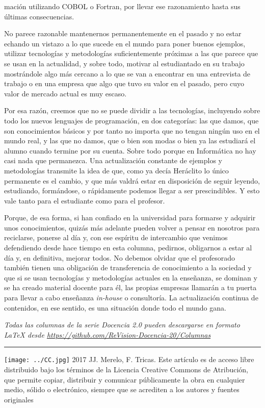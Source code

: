 \documentclass[twoside,10pt]{article}
\newcommand{\surl}[1]{{\small\url{#1}}}
\newcounter{vol}
\begin{document}
\begin{multicols}{2}
\noindent 
mación utilizando COBOL o Fortran, por llevar
ese razonamiento hasta sus últimas consecuencias. 


No parece razonable mantenernos permanentemente en el pasado y no
estar
echando un vistazo a lo que sucede en el mundo para poner
buenos ejemplos, utilizar tecnologías y metodologías suficientemente
próximas
a las que parece que se usan en la actualidad, y sobre todo,
motivar al estudiantado en su trabajo mostrándole algo más cercano a
lo que se van a encontrar en una entrevista de trabajo o en una
empresa que algo que tuvo su valor en el pasado, pero cuyo valor de
mercado actual es muy escaso. 

Por esa razón, creemos que no se puede dividir a
las tecnologías, incluyendo sobre todo los nuevos lenguajes de
programación, en dos categorías: las que damos, que son
conocimientos básicos y por tanto no importa que no tengan
ningún uso en el mundo real, y las que no damos, que o bien
son modas o bien ya las estudiará el alumno cuando termine por
su cuenta. Sobre todo porque en Informática no hay casi nada que
permanezca. Una
actualización constante de ejemplos y metodologías transmite la idea
de que, como ya decía Heráclito lo único permanente es el cambio, y
que más valdrá estar en disposición de seguir leyendo, estudiando,
formándose, o rápidamente podemos llegar a ser prescindibles.  Y esto
vale tanto para el estudiante como para el profesor. 

Porque, de esa forma, si han confiado en la universidad para formarse
y adquirir unos conocimientos, quizás más adelante pueden volver a
pensar en nosotros para reciclarse, ponerse al día y, con ese espíritu
de intercambio que venimos defendiendo desde hace tiempo en esta
columna, pedirnos, obligarnos a estar al día y, en definitiva, mejorar
todos. No debemos olvidar que el profesorado también tienen una
obligación de transferencia de conocimiento a la sociedad y que si se
usan tecnologías y metodologías actuales en la enseñanza, se dominan y
se ha creado material docente para él, las propias empresas llamarán a
tu puerta para llevar a cabo enseñanza {\em in-house} o
consultoría. La actualización continua de contenidos, en ese sentido,
es una situación donde todo el mundo gana. 

\medskip

\noindent\emph{Todas las columnas de la serie Docencia 2.0
pueden descargarse en formato LaTeX desde
\surl{https://github.com/ReVision-Docencia-20/Columnas}}

\noindent\rule{90mm}{1pt}

{\small \noindent\texttt{[image: ../CC.jpg]} 2017 JJ.
Merelo, F. Tricas. Este artículo es de acceso libre distribuido bajo
los términos
de la Licencia Creative Commons de Atribución, que permite copiar,
distribuir y comunicar públicamente la obra en cualquier medio, sólido
o electrónico, siempre que se acrediten a los autores y fuentes
originales}

\end{multicols}
\end{document}
